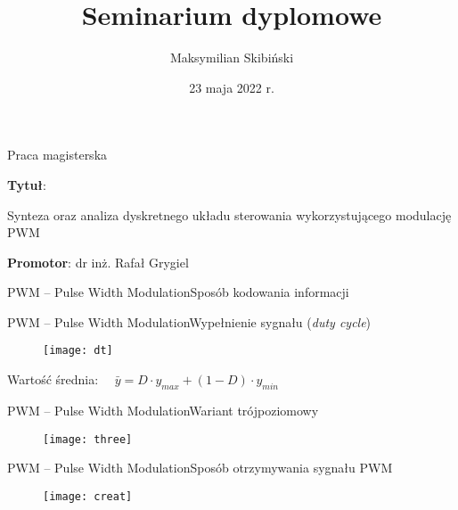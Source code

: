 \documentclass[11pt]{beamer}
\title[Seminarium dyplomowe]{%
	Seminarium dyplomowe
}
\author[Maksymilian Skibiński]{Maksymilian Skibiński}
\date{23 maja 2022 r.}
\begin{document}
\frame{\titlepage}


\begin{frame}{Praca magisterska}

\textbf{Tytuł}:
\begin{center}%
Synteza oraz analiza dyskretnego układu sterowania wykorzystującego modulację PWM
\end{center}

\vspace{0.5cm}

\textbf{Promotor}: dr inż. Rafał Grygiel

\end{frame}


\begin{frame}{PWM -- Pulse Width Modulation}{Sposób kodowania informacji}

\begin{figure}[htbp!]
	\centering
	
	\hfill%
\end{figure}

\end{frame}


\begin{frame}{PWM -- Pulse Width Modulation}{Wypełnienie sygnału (\emph{duty cycle})}

\begin{figure}[htbp!]
	\centering
	\texttt{[image: dt]}
\end{figure}

Wartość średnia: $ \quad
\bar{y} = D \cdot y_{max} + (1 - D) \cdot y_{min}
$

\end{frame}


\begin{frame}{PWM -- Pulse Width Modulation}{Wariant trójpoziomowy}

\begin{figure}[htbp!]
	\centering
	\texttt{[image: three]}
\end{figure}

\end{frame}


\begin{frame}{PWM -- Pulse Width Modulation}{Sposób otrzymywania sygnału PWM}

\begin{figure}[htbp!]
	\centering
	\texttt{[image: creat]}
\end{figure}

\end{frame}
\end{document}
